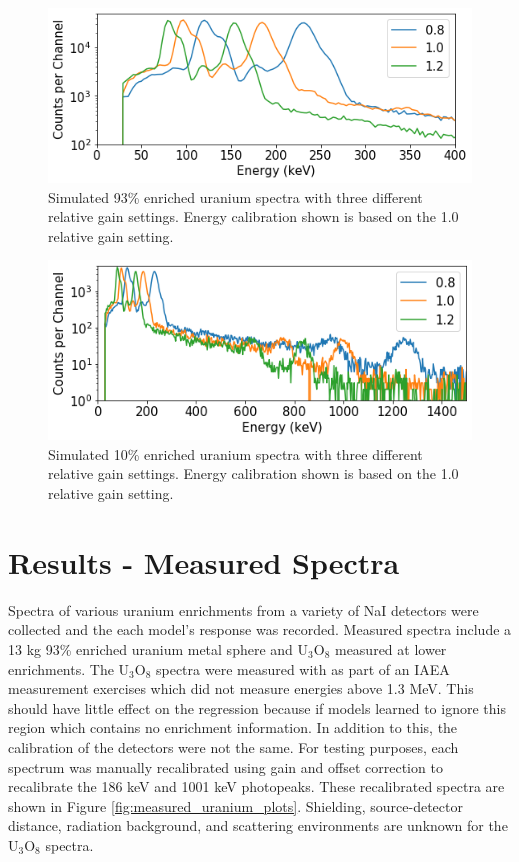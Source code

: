 \begin{figure}[H]
	\centering
	\includegraphics[width=0.8\linewidth]{images/simulated_uranium_calibration.png}
	\caption{Simulated 93\% enriched uranium spectra with three different relative gain settings. Energy calibration shown is based on the 1.0 relative gain setting.}
	\label{fig:simulated_uranium_calibration_93pct}
\end{figure}

\begin{figure}[H]
	\centering
	\includegraphics[width=0.8\linewidth]{images/simulated_uranium_calibration_1500kev.png}
	\caption{Simulated 10\% enriched uranium spectra with three different relative gain settings. Energy calibration shown is based on the 1.0 relative gain setting.}
	\label{fig:simulated_uranium_calibration_10pct}
\end{figure}

\section{Results - Measured Spectra}

Spectra of various uranium enrichments from a variety of NaI detectors were collected and the each model's response was recorded. Measured spectra include a 13 kg 93\% enriched uranium metal sphere \cite{Rothe1997} and U$_{3}$O$_{8}$ measured at lower enrichments. The U$_{3}$O$_{8}$ spectra were measured with as part of an IAEA measurement exercises which did not measure energies above 1.3 MeV. This should have little effect on the regression because if models learned to ignore this region which contains no enrichment information. In addition to this, the calibration of the detectors were not the same. For testing purposes, each spectrum was manually recalibrated using gain and offset correction to recalibrate the 186 keV and 1001 keV photopeaks. These recalibrated spectra are shown in Figure \ref{fig:measured_uranium_plots}. Shielding, source-detector distance, radiation background, and scattering environments are unknown for the U$_{3}$O$_{8}$ spectra.

